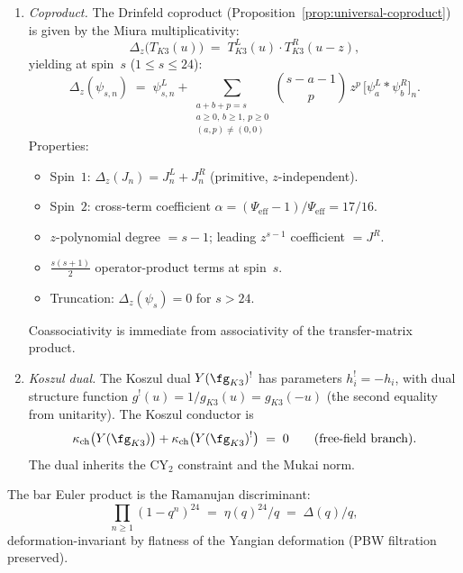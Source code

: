 \begin{theorem}
\begin{enumerate}[label=\textup{(\roman*)}]
\item \emph{Coproduct.}
The Drinfeld coproduct
(Proposition~\textup{\ref{prop:universal-coproduct}})
is given by the Miura multiplicativity:
\begin{equation}\label{eq:k3-yangian-coproduct}
 \Delta_z\bigl(T_{K3}(u)\bigr) \;=\;
 T_{K3}^L(u) \cdot T_{K3}^R(u - z),
\end{equation}
yielding at spin~$s$ ($1 \leq s \leq 24$):
\[
 \Delta_z(\psi_{s,n}) \;=\; \psi_{s,n}^L
 + \sum_{\substack{a + b + p = s \\ a \geq 0,\, b \geq 1,\, p \geq 0 \\
 (a,p) \neq (0,0)}}
 \binom{s - a - 1}{p}\, z^p \,
 \bigl[\psi_a^L \ast \psi_b^R\bigr]_n.
\]
Properties:
\begin{itemize}
 \item Spin~$1$: $\Delta_z(J_n) = J_n^L + J_n^R$ (primitive, $z$-independent).
 \item Spin~$2$: cross-term coefficient
 $\alpha = (\Psi_{\mathrm{eff}} - 1)/\Psi_{\mathrm{eff}} = 17/16$.
 \item $z$-polynomial degree $= s - 1$; leading $z^{s-1}$ coefficient $= J^R$.
 \item $\tfrac{s(s+1)}{2}$ operator-product terms at spin~$s$.
 \item Truncation: $\Delta_z(\psi_s) = 0$ for $s > 24$.
\end{itemize}
Coassociativity is immediate from associativity of the transfer-matrix
product.

\item \emph{Koszul dual.}
The Koszul dual $Y(\fg_{K3})^!$ has parameters $h_i^! = -h_i$, with
dual structure function $g^!(u) = 1/g_{K3}(u) = g_{K3}(-u)$
(the second equality from unitarity).
The Koszul conductor is
\[
 \kappa_{\mathrm{ch}}\bigl(Y(\fg_{K3})\bigr)
 + \kappa_{\mathrm{ch}}\bigl(Y(\fg_{K3})^!\bigr) \;=\; 0
 \qquad \text{(free-field branch)}.
\]
The dual inherits the CY$_2$ constraint and the Mukai norm.
\end{enumerate}

The bar Euler product is the Ramanujan discriminant:
\begin{equation}\label{eq:k3-yangian-bar-euler}
 \prod_{n \geq 1}(1 - q^n)^{24}
 \;=\; \eta(q)^{24}/q \;=\; \Delta(q)/q,
\end{equation}
deformation-invariant by flatness of the Yangian deformation
(PBW filtration preserved).
\end{theorem}


